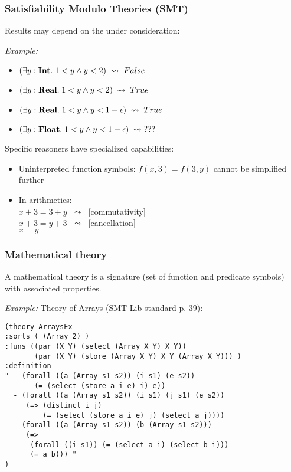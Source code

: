 \documentclass{beamer}
\begin{document}
\begin{frame}[fragile]\frametitle{Satisfiability Modulo Theories (SMT)}

  Results may depend on the  under consideration:

  \emph{Example:}
  \begin{itemize}
  \item $(\exists y:\textbf{Int}.\; 1 < y \wedge y < 2) \; \leadsto \; False$
  \item $(\exists y:\textbf{Real}.\; 1 < y \wedge y < 2) \; \leadsto \; True$
  \item $(\exists y:\textbf{Real}.\; 1 < y \wedge y < 1 + \epsilon) \; \leadsto \; True$
  \item $(\exists y:\textbf{Float}.\; 1 < y \wedge y < 1 + \epsilon) \; \leadsto \; ???$
  \end{itemize}

  \vspace{5mm}
Specific reasoners have specialized capabilities:
\begin{itemize}
\item Uninterpreted function symbols:
  $f(x, 3) = f(3, y)$ cannot be simplified further
\item In arithmetics:\\
    $x + 3 = 3 + y$ $\; \leadsto \;$ [commutativity]\\
    $x + 3 = y + 3$ $\; \leadsto \;$ [cancellation]\\
    $x = y$
\end{itemize}
  
\end{frame}

\begin{frame}[fragile]\frametitle{Mathematical theory}

  A mathematical theory is a signature (set of function and predicate symbols)
  with associated properties.

  \emph{Example:} Theory of Arrays (SMT Lib standard p. 39):

\small
\begin{verbatim}
(theory ArraysEx
:sorts ( (Array 2) )
:funs ((par (X Y) (select (Array X Y) X Y))
       (par (X Y) (store (Array X Y) X Y (Array X Y))) )
:definition
" - (forall ((a (Array s1 s2)) (i s1) (e s2))
       (= (select (store a i e) i) e))
  - (forall ((a (Array s1 s2)) (i s1) (j s1) (e s2))
     (=> (distinct i j) 
         (= (select (store a i e) j) (select a j))))
  - (forall ((a (Array s1 s2)) (b (Array s1 s2)))
     (=>
      (forall ((i s1)) (= (select a i) (select b i))) 
      (= a b))) "
)
\end{verbatim}
\normalsize  

\end{frame}
\end{document}
